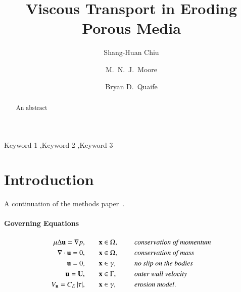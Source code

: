 \documentclass[preprint, 10pt]{elsarticle}
\begin{document}
\title{Viscous Transport in Eroding Porous Media}



\author[SH]{Shang-Huan Chiu}
\author[Nick]{M.~N.~J.~Moore}
\author[Bryan]{Bryan D.~Quaife}

\address[SH]{Department of Scientific Computing, Florida State
University, Tallahassee, FL, 32306.}
\address[Nick]{Department of Mathematics and Geophysical Fluid Dynamics Institute, Florida State University, Tallahassee, FL, 32306.}
\address[Bryan]{Department of Scientific Computing and Geophysical Fluid Dynamics Institute, Florida State University, Tallahassee, FL, 32306.}

\begin{abstract} 
  An abstract
\end{abstract}

\begin{keyword}
  Keyword 1 \sep Keyword 2 \sep Keyword 3 
\end{keyword}

\maketitle

\section{Introduction}
\label{s:intro}
A continuation of the methods paper~\cite{qua-moo2018}.
\paragraph{Governing Equations}
\begin{equation}
\label{eqn:erosionModel}
\begin{split}
  \mu \Delta {\mathbf{u}} = {\nabla} p, &\hspace{20pt} {\mathbf{x}} \in \Omega, \hspace*{.2in} &&\mbox{\em conservation
of momentum}\\
{\nabla} \cdot {\mathbf{u}} = 0, &\hspace{20pt} {\mathbf{x}} \in \Omega, \hspace*{.2in} &&\mbox{\em conservation of mass} \\
{\mathbf{u}} = 0, &\hspace{20pt} {\mathbf{x}} \in \gamma, \hspace*{.2in} &&\mbox{\em no slip on the
bodies} \\
{\mathbf{u}} = {\mathbf{U}}, &\hspace{20pt} {\mathbf{x}} \in \Gamma, \hspace*{.2in} &&\mbox{\em outer wall
velocity} \\
V_{\mathbf{n}} = C_E \, \lvert \tau \rvert, &\hspace{20pt} {\mathbf{x}} \in \gamma,
&&\mbox{\em erosion model}.
\end{split}
\end{equation}
\end{document}
